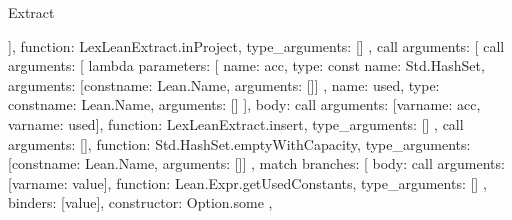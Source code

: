 \begin{lexlean}{Extract}
\begin{toolingmodule}
{{{{{{{{{{{{                                    ],
                                    function: LexLeanExtract.inProject,
                                    type_arguments: []
                                  }
                                },
                                call{
                                  arguments: [
                                    call{
                                      arguments: [
                                        lambda{
                                          parameters: [
                                            {
                                              name: acc,
                                              type: const{
                                                name: Std.HashSet,
                                                arguments: [const{name: Lean.Name, arguments: []}]
                                              }
                                            },
                                            {
                                              name: used,
                                              type: const{name: Lean.Name, arguments: []}
                                            }
                                          ],
                                          body: call{
                                            arguments: [var{name: acc}, var{name: used}],
                                            function: LexLeanExtract.insert,
                                            type_arguments: []
                                          }
                                        },
                                        call{
                                          arguments: [],
                                          function: Std.HashSet.emptyWithCapacity,
                                          type_arguments: [const{name: Lean.Name, arguments: []}]
                                        },
                                        match{
                                          branches: [
                                            {
                                              body: call{
                                                arguments: [var{name: value}],
                                                function: Lean.Expr.getUsedConstants,
                                                type_arguments: []
                                              },
                                              binders: [value],
                                              constructor: Option.some
                                            },
                                            {
}}}}}}}}}}}}}}
\end{toolingmodule}
\end{lexlean}
